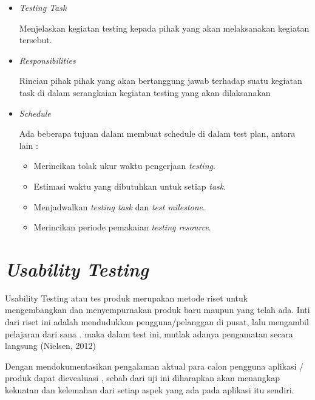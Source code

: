 \begin{itemize}
	\newpage
	\item \textit{Testing Task}
	\par Menjelaskan kegiatan testing kepada pihak yang akan melaksanakan kegiatan tersebut.
	
	\item \textit{Responsibilities}
	\par Rincian pihak pihak yang akan bertanggung jawab terhadap suatu kegiatan task di dalam serangkaian kegiatan testing yang akan dilaksanakan
	
	\item \textit{Schedule}
	\par Ada beberapa tujuan dalam membuat schedule di dalam test plan, antara lain :
	\begin{itemize}
		\itemsep0em
		\item Merincikan tolak ukur waktu pengerjaan \textit{testing}.
		\item Estimasi waktu yang dibutuhkan untuk setiap \textit{task}.
		\item Menjadwalkan \textit{testing task} dan \textit{test milestone}.
		\item Merincikan periode pemakaian \textit{testing resource}. 
		\cite{Shanardi}
	\end{itemize}
\end{itemize}

\section {\textit{Usability Testing}}
\par Usability Testing atau tes produk merupakan metode riset untuk mengembangkan dan menyempurnakan produk baru maupun yang telah ada. Inti dari riset ini adalah mendudukkan pengguna/pelanggan di pusat, lalu mengambil pelajaran dari sana . maka dalam test ini, mutlak adanya pengamatan secara langsung (Nielsen, 2012)
\par Dengan mendokumentasikan pengalaman aktual para calon pengguna aplikasi / produk dapat dievealuasi , sebab dari uji ini diharapkan akan menangkap kekuatan dan kelemahan dari setiap aspek yang ada pada aplikasi itu sendiri.


